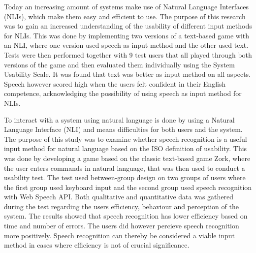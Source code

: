 Today an increasing amount of systems make use of Natural Language Interfaces (NLIs), which make them easy and efficient to use. The purpose of this research was to gain an increased understanding of the usability of different input methods for NLIs. This was done by implementing two versions of a text-based game with an NLI, where one version used speech as input method and the other used text. Tests were then performed together with 9 test users that all played through both versions of the game and then evaluated them individually using the System Usability Scale. It was found that text was better as input method on all aspects. Speech however scored high when the users felt confident in their English competence, acknowledging the possibility of using speech as input method for NLIs.

To interact with a system using natural language is done by using a Natural Language Interface (NLI) and means
difficulties for both users and the system. The purpose of this study was to examine whether speech recognition is a useful input method for natural language based on the ISO definition of usability. This was done by developing a game based on the classic text-based game Zork, where the user enters commands in natural language, that was then used to conduct a usability test. The test used between-group design on two groups of users where the first group used keyboard input and the second group used speech recognition with Web Speech API. Both qualitative and quantitative data was gathered during the test regarding the users efficiency, behaviour and perception of the system. The results showed that speech recognition has lower efficiency based on time and number of errors. The users did however percieve speech recognition more positively. Speech recognition can thereby be considered a viable input method in cases where efficiency is not of crucial significance.